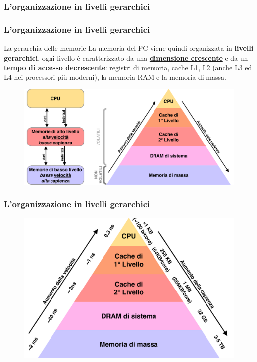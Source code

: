 \subsubsection[L'organizzazione in livelli gerarchici]{L'organizzazione in livelli gerarchici}
\begin{frame}
	\frametitle{L'organizzazione in livelli gerarchici}
	 
	\begin{block}{La gerarchia delle memorie}
		La memoria del PC viene quindi organizzata in \textbf{livelli gerarchici}, ogni livello è caratterizzato da una \underline{\textbf{dimensione crescente}} e da un \underline{\textbf{tempo di accesso decrescente}}: registri di memoria, cache L1, L2 (anche L3 ed L4 nei processori più moderni), la memoria RAM e la memoria di massa.
	\end{block}
	
	\begin{figure}[!htbp] 
		\centering
		\includegraphics[width=0.7\linewidth]{images/5_memory/memory_hierarchy.pdf}
		\label{fig:memory_hierarchy}
	\end{figure} 

\end{frame}


\begin{frame}
	\frametitle{L'organizzazione in livelli gerarchici}

	\begin{figure}[!htbp] 
		\centering
		\includegraphics[width=0.9\linewidth]{images/5_memory/memory_hierarchy_info.pdf}
		\label{fig:memory_hierarchy}
	\end{figure} 

\end{frame}

